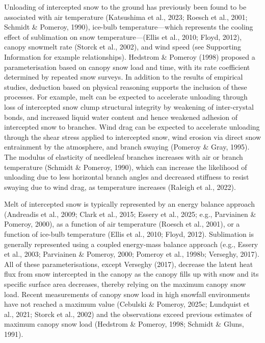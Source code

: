 \documentclass[
]{agujournal2019}
\begin{document}
Unloading of intercepted snow to the ground has previously been found to
be associated with air temperature (Katsushima et al., 2023; Roesch et
al., 2001; Schmidt \& Pomeroy, 1990), ice-bulb temperature---which
represents the cooling effect of sublimation on snow
temperature---(Ellis et al., 2010; Floyd, 2012), canopy snowmelt rate
(Storck et al., 2002), and wind speed (see Supporting Information for
example relationships). Hedstrom \& Pomeroy (1998) proposed a
parameterisation based on canopy snow load and time, with its rate
coefficient determined by repeated snow surveys. In addition to the
results of empirical studies, deduction based on physical reasoning
supports the inclusion of these processes. For example, melt can be
expected to accelerate unloading through loss of intercepted snow clump
structural integrity by weakening of inter-crystal bonds, and increased
liquid water content and hence weakened adhesion of intercepted snow to
branches. Wind drag can be expected to accelerate unloading through the
shear stress applied to intercepted snow, wind erosion via direct snow
entrainment by the atmosphere, and branch swaying (Pomeroy \& Gray,
1995). The modulus of elasticity of needleleaf branches increases with
air or branch temperature (Schmidt \& Pomeroy, 1990), which can increase
the likelihood of unloading due to less horizontal branch angles and
decreased stiffness to resist swaying due to wind drag, as temperature
increases (Raleigh et al., 2022).

Melt of intercepted snow is typically represented by an energy balance
approach (Andreadis et al., 2009; Clark et al., 2015; Essery et al.,
2025; e.g., Parviainen \& Pomeroy, 2000), as a function of air
temperature (Roesch et al., 2001), or a function of ice-bulb temperature
(Ellis et al., 2010; Floyd, 2012). Sublimation is generally represented
using a coupled energy-mass balance approach (e.g., Essery et al., 2003;
Parviainen \& Pomeroy, 2000; Pomeroy et al., 1998b; Verseghy, 2017). All
of these parameterisations, except Verseghy (2017), decrease the latent
heat flux from snow intercepted in the canopy as the canopy fills up
with snow and its specific surface area decreases, thereby relying on
the maximum canopy snow load. Recent measurements of canopy snow load in
high snowfall environments have not reached a maximum value (Cebulski \&
Pomeroy, 2025c; Lundquist et al., 2021; Storck et al., 2002) and the
observations exceed previous estimates of maximum canopy snow load
(Hedstrom \& Pomeroy, 1998; Schmidt \& Gluns, 1991).
\end{document}
